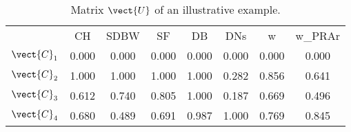 \begin{table}
\centering
\begin{tabular}{cccccccc}
 & CH & SDBW & SF & DB & DNs & w & w_PRAr \\
$\vect{C}_1$ & 0.000 & 0.000 & 0.000 & 0.000 & 0.000 & 0.000 & 0.000 \\
$\vect{C}_2$ & 1.000 & 1.000 & 1.000 & 1.000 & 0.282 & 0.856 & 0.641 \\
$\vect{C}_3$ & 0.612 & 0.740 & 0.805 & 1.000 & 0.187 & 0.669 & 0.496 \\
$\vect{C}_4$ & 0.680 & 0.489 & 0.691 & 0.987 & 1.000 & 0.769 & 0.845 \\
\end{tabular}
\caption{Matrix $\vect{U}$ of an illustrative example.}
\label{table:tab:example:U}
\end{table}
